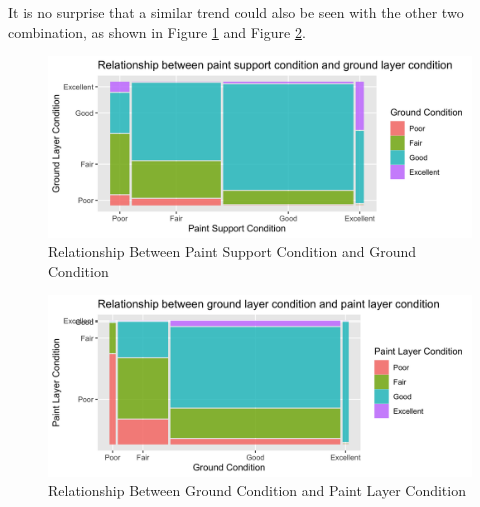\documentclass[11pt, oneside]{article}
\begin{document}
\noindent It is no surprise that a similar trend could also be seen with the other two combination, as shown in Figure \ref{ps_gr_mosaic} and Figure \ref{gr_pl_mosaic}.

\begin{figure}[H]
    \centering
    \includegraphics[scale=0.19]{images/ps_ground_mosaic.png}
    \caption{Relationship Between Paint Support Condition and Ground Condition}
    \label{ps_gr_mosaic}
\end{figure}

\begin{figure}[H]
    \centering
    \includegraphics[scale=0.18]{images/gr_pl_mosaic.png}
    \caption{Relationship Between Ground Condition and Paint Layer Condition}
    \label{gr_pl_mosaic}
\end{figure}
\end{document}
